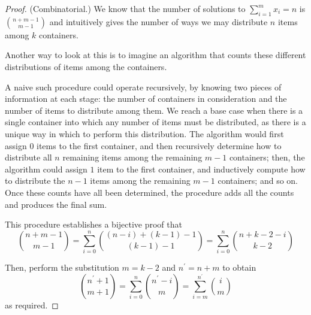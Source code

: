 \documentclass[11pt]{article}
\begin{document}
\begin{proof}{(Combinatorial.)}
    We know that the number of solutions to $\sum_{i=1}^m x_i = n$ is
    $\binom{n+m-1}{m-1}$ and intuitively gives the number of ways we may
    distribute $n$ items among $k$ containers.

    Another way to look at this is to imagine an algorithm that counts these
    different distributions of items among the containers.

    A naive such procedure could operate recursively, by knowing two pieces of
    information at each stage: the number of containers in consideration and
    the number of items to distribute among them.
    We reach a base case when there is a single container into which any number
    of items must be distributed, as there is a unique way in which to perform
    this distribution.
    The algorithm would first assign $0$ items to the first container,
    and then recursively determine how to distribute all $n$ remaining items
    among the remaining $m-1$ containers;
    then, the algorithm could assign $1$ item to the first container, and
    inductively compute how to distribute the $n-1$ items among the remaining
    $m-1$ containers; and so on.
    Once these counts have all been determined, the procedure adds all the
    counts and produces the final sum.

    This procedure establishes a bijective proof that
    \begin{equation*}
        \binom{n + m - 1}{m - 1}
        = \sum_{i=0}^n \binom{(n - i) + (k - 1) - 1}{(k - 1) - 1}
        = \sum_{i=0}^n \binom{n + k - 2 - i}{k - 2}
    \end{equation*}

    Then, perform the substitution $m = k - 2$ and $n^\prime = n + m$ to
    obtain
    \begin{equation*}
        \binom{n^\prime + 1}{m + 1}
        =
        \sum_{i=0}^n \binom{n^\prime - i}{m}
        = 
        \sum_{i=m}^{n^\prime} \binom{i}{m}
    \end{equation*}
    as required.
\end{proof}
\end{document}
